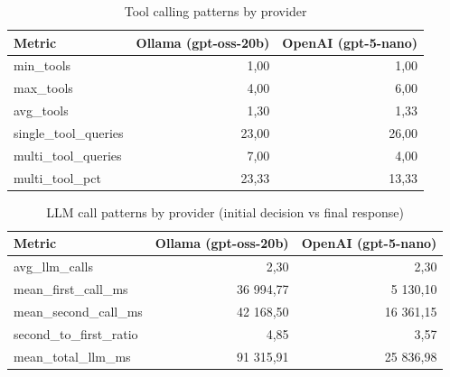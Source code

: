 \begin{table}[htbp]
    \centering
    \small
    \begin{tabular}{lrr}
        \toprule
        Metric                & Ollama (gpt-oss-20b) & OpenAI (gpt-5-nano) \\
        \midrule
        min\_tools            & 1,00                 & 1,00                \\
        max\_tools            & 4,00                 & 6,00                \\
        avg\_tools            & 1,30                 & 1,33                \\
        single\_tool\_queries & 23,00                & 26,00               \\
        multi\_tool\_queries  & 7,00                 & 4,00                \\
        multi\_tool\_pct      & 23,33                & 13,33               \\
        \bottomrule
    \end{tabular}
    \caption{Tool calling patterns by provider}
    \label{tab:tool-patterns}
\end{table}

\begin{table}[htbp]
    \centering
    \small
    \begin{tabular}{lrr}
        \toprule
        Metric                   & Ollama (gpt-oss-20b) & OpenAI (gpt-5-nano) \\
        \midrule
        avg\_llm\_calls          & 2,30                 & 2,30                \\
        mean\_first\_call\_ms    & 36 994,77            & 5 130,10            \\
        mean\_second\_call\_ms   & 42 168,50            & 16 361,15           \\
        second\_to\_first\_ratio & 4,85                 & 3,57                \\
        mean\_total\_llm\_ms     & 91 315,91            & 25 836,98           \\
        \bottomrule
    \end{tabular}
    \caption{LLM call patterns by provider (initial decision vs final response)}
    \label{tab:llm-patterns}
\end{table}

